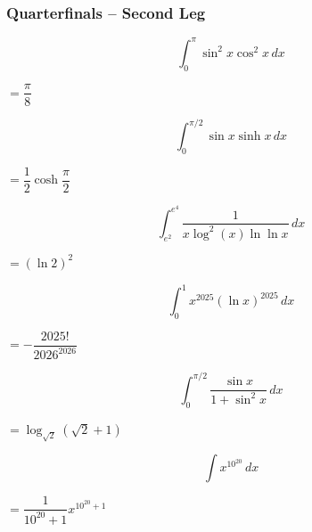 \subsubsection*{Quarterfinals -- Second Leg}
\begin{questions}

\question \[ \int_0^{\pi} \sin^2 x\cos^2 x\, dx \]
\begin{solution} $= \dfrac{\pi}{8}$ \end{solution}

\question \[ \int_0^{\pi/2} \sin x\sinh x\, dx \]
\begin{solution} $= \dfrac{1}{2}\cosh\dfrac{\pi}{2}$ \end{solution}

\question \[ \int_{e^2}^{e^4} \frac{1}{x\log^2(x)\ln\ln x}\, dx \]
\begin{solution} $= (\ln 2)^2$ \end{solution}

\question \[ \int_0^1 x^{2025}(\ln x)^{2025}\, dx \]
\begin{solution} $= -\dfrac{2025!}{2026^{2026}}$ \end{solution}

\question[Tiebreaker 1] \[ \int_0^{\pi/2} \frac{\sin x}{1+\sin^2 x}\, dx \]
\begin{solution} $= \log_{\sqrt 2}\left(\sqrt 2+1\right)$ \end{solution}

\question[Tiebreaker 2] \[ \int x^{10^{20}}\, dx \]
\begin{solution} $= \dfrac{1}{10^{20}+1}x^{10^{20}+1}$ \end{solution}

\end{questions}

